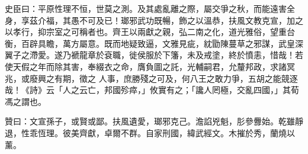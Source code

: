 \begin{pinyinscope}
 史臣曰：平原性理不恒，世莫之測。及其處亂離之際，屬交爭之秋，而能遠害全身，享茲介福，其愚不可及已！瑯邪武功既暢，飾之以溫恭，扶風文教克宣，加之以孝行，抑宗室之可稱者也。齊王以兩獻之親，弘二南之化，道光雅俗，望重台衡，百辟具瞻，萬方屬意。既而地疑致逼，文雅見疵，紞勖陳蔓草之邪謀，武皇深翼子之滯愛。遂乃褫龍章於袞職，徙侯服於下籓，未及戒塗，終於憤恚，惜哉！若使天假之年而除其害，奉綴衣之命，膺負圖之託，光輔嗣君，允釐邦政，求諸冥兆，或廢興之有期，徵之
 人事，庶勝殘之可及，何八王之敢力爭，五胡之能競逐哉！《詩》云「人之云亡，邦國殄瘁，」攸實有之；「讒人罔極，交亂四國，」其荀馮之謂也。



 贊曰：文宣孫子，或賢或鄙。扶風遺愛，瑯邪克己。澹諂兇魁，肜參釁始。乾雖靜退，性乖恆理。彼美齊獻，卓爾不群。自家刑國，緯武經文。木摧於秀，蘭燒以薰。



\end{pinyinscope}
